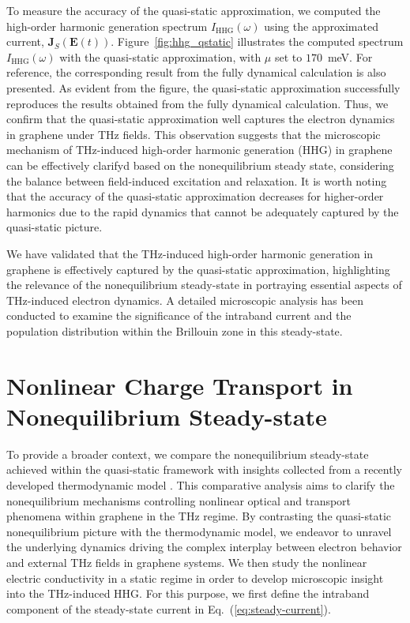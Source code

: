 To measure the accuracy of the quasi-static approximation, we computed the high-order harmonic
generation spectrum $I_{\mathrm{HHG}}(\omega)$ using the approximated current, $\mathbf J_S\left(
	\mathbf E(t) \right)$. Figure~\ref{fig:hhg_qstatic} illustrates the computed spectrum $I_{\mathrm{HHG}}(\omega)$ with the quasi-static approximation, with $\mu$ set to $170$~meV. For reference, the corresponding result from the fully dynamical calculation is also presented. As evident from the figure, the quasi-static approximation successfully reproduces the results obtained from the fully dynamical calculation. Thus, we confirm that the quasi-static approximation well captures the electron dynamics in graphene under THz fields. This observation suggests that the microscopic mechanism of THz-induced high-order harmonic generation (HHG) in graphene can be effectively clarifyd based on the nonequilibrium steady state, considering the balance between field-induced excitation and relaxation. It is worth noting that the accuracy of the quasi-static approximation decreases for higher-order harmonics due to the rapid dynamics that cannot be adequately captured by the quasi-static picture.

We have validated that the THz-induced high-order harmonic generation in graphene is effectively captured by the quasi-static approximation, highlighting the relevance of the nonequilibrium steady-state in portraying essential aspects of THz-induced electron dynamics. A detailed microscopic analysis has been conducted to examine the significance of the intraband current and the population distribution within the Brillouin zone in this steady-state.
\section{Nonlinear Charge Transport in Nonequilibrium Steady-state}
To provide a broader context, we compare the nonequilibrium steady-state achieved within the quasi-static framework with insights collected from a recently developed thermodynamic model \cite{mics2015thermodynamic}. This comparative analysis aims to clarify the nonequilibrium mechanisms controlling nonlinear optical and transport phenomena within graphene in the THz regime. By contrasting the quasi-static nonequilibrium picture with the thermodynamic model, we endeavor to unravel the underlying dynamics driving the complex interplay between electron behavior and external THz fields in graphene systems.
We then study the nonlinear electric conductivity in a static regime in order to develop
microscopic insight into the THz-induced HHG. For this purpose, we first define the intraband
component of the steady-state current in Eq.~(\ref{eq:steady-current}).

